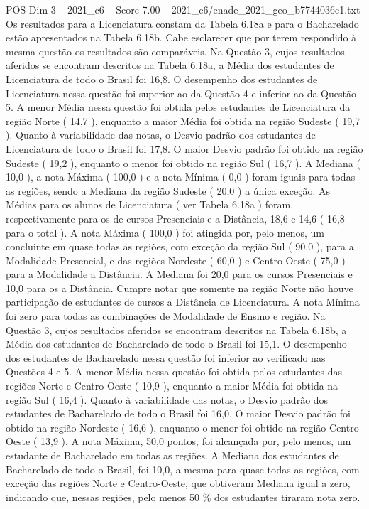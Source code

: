 \begin{textsample}{POS Dim 3 – 2021\_c6 – Score 7.00 – 2021\_c6/enade\_2021\_geo\_b7744036e1.txt}
Os resultados para a Licenciatura constam da Tabela 6.18a e para o Bacharelado estão apresentados na Tabela 6.18b.
Cabe esclarecer que por terem respondido à mesma questão os resultados são comparáveis.
Na Questão 3, cujos resultados aferidos se encontram descritos na Tabela 6.18a, a Média dos estudantes de Licenciatura de todo o Brasil foi 16,8.
O desempenho dos estudantes de Licenciatura nessa questão foi superior ao da Questão 4 e inferior ao da Questão 5.
A menor Média nessa questão foi obtida pelos estudantes de Licenciatura da região Norte ( 14,7 ), enquanto a maior Média foi obtida na região Sudeste ( 19,7 ).
Quanto à variabilidade das notas, o Desvio padrão dos estudantes de Licenciatura de todo o Brasil foi 17,8.
O maior Desvio padrão foi obtido na região Sudeste ( 19,2 ), enquanto o menor foi obtido na região Sul ( 16,7 ).
A Mediana ( 10,0 ), a nota Máxima ( 100,0 ) e a nota Mínima ( 0,0 ) foram iguais para todas as regiões, sendo a Mediana da região Sudeste ( 20,0 ) a única exceção.
As Médias para os alunos de Licenciatura ( ver Tabela 6.18a ) foram, respectivamente para os de cursos Presenciais e a Distância, 18,6 e 14,6 ( 16,8 para o total ).
A nota Máxima ( 100,0 ) foi atingida por, pelo menos, um concluinte em quase todas as regiões, com exceção da região Sul ( 90,0 ), para a Modalidade Presencial, e das regiões Nordeste ( 60,0 ) e Centro-Oeste ( 75,0 ) para a Modalidade a Distância.
A Mediana foi 20,0 para os cursos Presenciais e 10,0 para os a Distância.
Cumpre notar que somente na região Norte não houve participação de estudantes de cursos a Distância de Licenciatura.
A nota Mínima foi zero para todas as combinações de Modalidade de Ensino e região.
Na Questão 3, cujos resultados aferidos se encontram descritos na Tabela 6.18b, a Média dos estudantes de Bacharelado de todo o Brasil foi 15,1.
O desempenho dos estudantes de Bacharelado nessa questão foi inferior ao verificado nas Questões 4 e 5.
A menor Média nessa questão foi obtida pelos estudantes das regiões Norte e Centro-Oeste ( 10,9 ), enquanto a maior Média foi obtida na região Sul ( 16,4 ).
Quanto à variabilidade das notas, o Desvio padrão dos estudantes de Bacharelado de todo o Brasil foi 16,0.
O maior Desvio padrão foi obtido na região Nordeste ( 16,6 ), enquanto o menor foi obtido na região Centro-Oeste ( 13,9 ).
A nota Máxima, 50,0 pontos, foi alcançada por, pelo menos, um estudante de Bacharelado em todas as regiões.
A Mediana dos estudantes de Bacharelado de todo o Brasil, foi 10,0, a mesma para quase todas as regiões, com exceção das regiões Norte e Centro-Oeste, que obtiveram Mediana igual a zero, indicando que, nessas regiões, pelo menos 50 \% dos estudantes tiraram nota zero.

\end{textsample}
